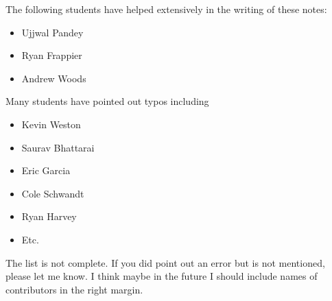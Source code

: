 \documentclass[
]{article}
\providecommand{\tightlist}{%
  \setlength{\itemsep}{0pt}\setlength{\parskip}{0pt}}
\begin{document}
The following students have helped extensively in the writing of these
notes:

\begin{itemize}
\tightlist
\item
  Ujjwal Pandey
\item
  Ryan Frappier
\item
  Andrew Woods
\end{itemize}

Many students have pointed out typos including

\begin{itemize}
\tightlist
\item
  Kevin Weston
\item
  Saurav Bhattarai
\item
  Eric Garcia
\item
  Cole Schwandt
\item
  Ryan Harvey
\item
  Etc.
\end{itemize}

The list is not complete. If you did point out an error but is not
mentioned, please let me know. I think maybe in the future I should
include names of contributors in the right margin.
\end{document}
